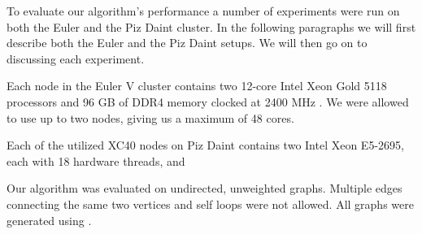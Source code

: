 To evaluate our algorithm's performance a number of experiments were run on both the Euler and the
Piz Daint cluster. In the following paragraphs we will first describe both the Euler and the Piz
Daint setups. We will then go on to discussing each experiment.

Each node in the Euler V cluster contains two 12-core Intel Xeon Gold 5118 processors and 96 GB of
DDR4 memory clocked at 2400 MHz \cite{Euler}. We were allowed to use up to two nodes, giving us a
maximum of 48 cores.

Each of the utilized XC40 nodes on Piz Daint contains two Intel Xeon E5-2695, each with 18 hardware threads,
and

Our algorithm was evaluated on undirected, unweighted graphs. Multiple edges connecting the same
two vertices and self loops were not allowed. All graphs were generated using \cite{Parmat}.

